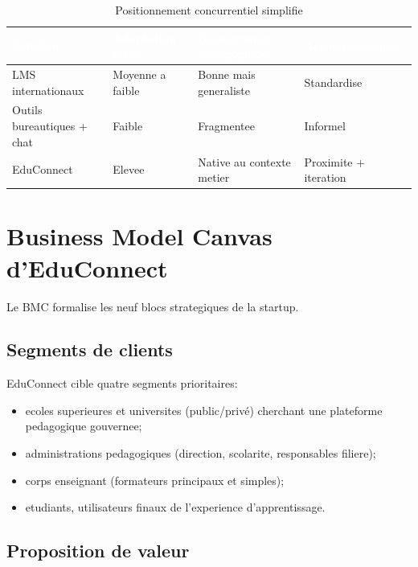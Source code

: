 ﻿\documentclass[12pt,a4paper,oneside]{report}
\begin{document}
\renewcommand{\arraystretch}{1.3}
\begin{table}[H]
\centering
\caption{Positionnement concurrentiel simplifie}
\label{tab:positionnement_concurrentiel}
\begin{tabular}{|p{3.0cm}|p{3.2cm}|p{3.2cm}|p{3.2cm}|}
\hline
\rowcolor{ustoblue}
\textcolor{white}{Solution} & \textcolor{white}{Adaptation locale} & \textcolor{white}{Gouvernance pedagogique} & \textcolor{white}{Accompagnement} \\
\hline
LMS internationaux & Moyenne a faible & Bonne mais generaliste & Standardise \\
\hline
Outils bureautiques + chat & Faible & Fragmentee & Informel \\
\hline
EduConnect & Elevee & Native au contexte metier & Proximite + iteration \\
\hline
\end{tabular}
\end{table}

\section{Business Model Canvas d'EduConnect}

Le BMC formalise les neuf blocs strategiques de la startup\cite{osterwalder2010bmc}.

\subsection{Segments de clients}

EduConnect cible quatre segments prioritaires:
\begin{itemize}
  \item ecoles superieures et universites (public/privé) cherchant une plateforme pedagogique gouvernee;
  \item administrations pedagogiques (direction, scolarite, responsables filiere);
  \item corps enseignant (formateurs principaux et simples);
  \item etudiants, utilisateurs finaux de l'experience d'apprentissage.
\end{itemize}

\subsection{Proposition de valeur}
\end{document}
